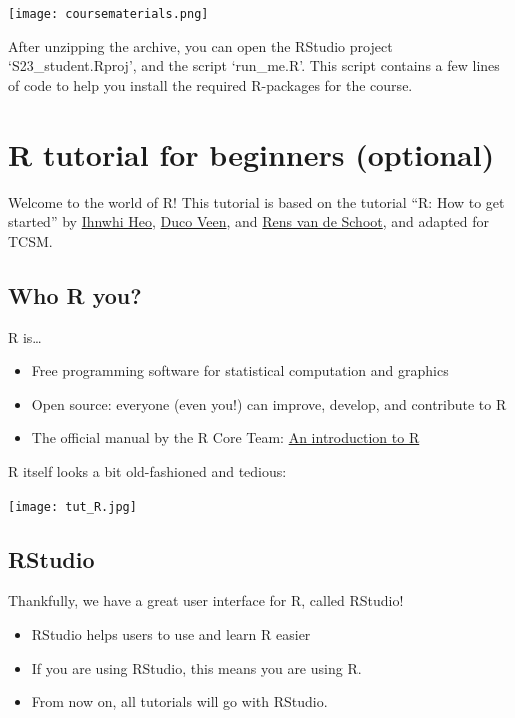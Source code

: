 \documentclass[
]{book}
\providecommand{\tightlist}{%
  \setlength{\itemsep}{0pt}\setlength{\parskip}{0pt}}
\begin{document}
\texttt{[image: coursematerials.png]}

After unzipping the archive, you can open the RStudio project `S23\_student.Rproj', and the script `run\_me.R'. This script contains a few lines of code to help you install the required R-packages for the course.

\hypertarget{r-tutorial-for-beginners-optional}{%
\section{R tutorial for beginners (optional)}\label{r-tutorial-for-beginners-optional}}

Welcome to the world of R! This tutorial is based on the tutorial ``R: How to get started'' by \href{https://www.linkedin.com/in/ihnwhi-heo/}{Ihnwhi Heo}, \href{https://www.ducoveen.com/}{Duco Veen}, and \href{https://www.rensvandeschoot.com/}{Rens van de Schoot}, and adapted for TCSM.

\hypertarget{who-r-you}{%
\subsection{Who R you?}\label{who-r-you}}

R is\ldots{}

\begin{itemize}
\tightlist
\item
  Free programming software for statistical computation and graphics
\item
  Open source: everyone (even you!) can improve, develop, and contribute to R
\item
  The official manual by the R Core Team: \href{https://cran.r-project.org/doc/manuals/r-release/R-intro.pdf}{An introduction to R}
\end{itemize}

R itself looks a bit old-fashioned and tedious:

\texttt{[image: tut\_R.jpg]}

\hypertarget{rstudio}{%
\subsection{RStudio}\label{rstudio}}

Thankfully, we have a great user interface for R, called RStudio!

\begin{itemize}
\tightlist
\item
  RStudio helps users to use and learn R easier
\item
  If you are using RStudio, this means you are using R.
\item
  From now on, all tutorials will go with RStudio.
\end{itemize}
\end{document}
